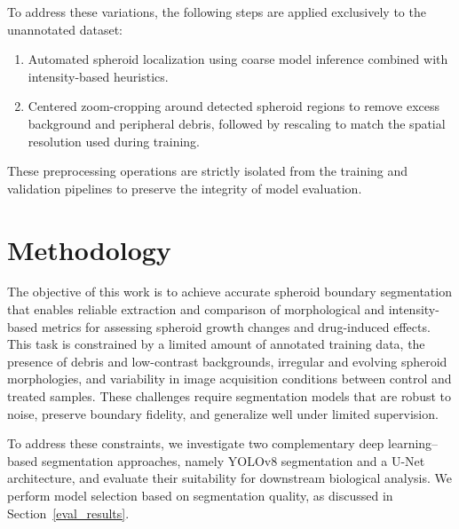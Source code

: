 \documentclass[sigconf, nonacm]{acmart}
\begin{document}
To address these variations, the following steps are applied exclusively to the unannotated dataset:

\begin{enumerate}
    \item Automated spheroid localization using coarse model inference combined with intensity-based heuristics.
    
    \item Centered zoom-cropping around detected spheroid regions to remove excess background and peripheral debris, followed by rescaling to match the spatial resolution used during training.
    
       

\end{enumerate}

These preprocessing operations are strictly isolated from the training and validation pipelines to preserve the integrity of model evaluation.

\section{Methodology}\label{methodology}

The objective of this work is to achieve accurate spheroid boundary segmentation that enables reliable extraction and comparison of morphological and intensity-based metrics for assessing spheroid growth changes and drug-induced effects. This task is constrained by a limited amount of annotated training data, the presence of debris and low-contrast backgrounds, irregular and evolving spheroid morphologies, and variability in image acquisition conditions between control and treated samples. These challenges require segmentation models that are robust to noise, preserve boundary fidelity, and generalize well under limited supervision.

To address these constraints, we investigate two complementary deep learning–based segmentation approaches, namely YOLOv8 segmentation and a U-Net architecture, and evaluate their suitability for downstream biological analysis. We perform model selection based on segmentation quality, as discussed in Section~\ref{eval_results}.


\end{document}
